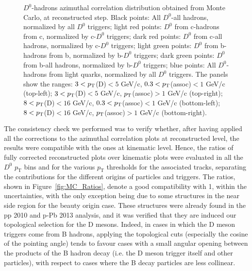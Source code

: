 \begin{figure}
\caption{$D^0$-hadrons azimuthal correlation distribution obtained from Monte Carlo, at reconstructed step. Black points: All $D^0$-all hadrons, normalized by all $D^0$ triggers; light red points: $D^0$ from c-hadrons from c, normalized by c-$D^0$ triggers; dark red points: $D^0$ from c-all hadrons, normalized by c-$D^0$ triggers; light green points: $D^0$ from b-hadrons from b, normalized by b-$D^0$ triggers; dark green points: $D^0$ from b-all hadrons, normalized by b-$D^0$ triggers; blue points: All $D^0$-hadrons from light quarks, normalized by all $D^0$ triggers.
The panels show the ranges: $3 < p_{\rm T}$(D)$ < 5$ GeV/c, $0.3 < p_{\rm T}$(assoc)$ < 1$ GeV/c (top-left); $3 < p_{\rm T}$(D)$ < 5$ GeV/c, $p_{\rm T}$(assoc)$ > 1$ GeV/c (top-right); $8 < p_{\rm T}$(D)$ < 16$ GeV/c, $0.3 < p_{\rm T}$(assoc)$ < 1$ GeV/c (bottom-left); $8 < p_{\rm T}$(D)$ < 16$ GeV/c, $p_{\rm T}$(assoc)$ > 1$ GeV/c (bottom-right).}
\label{fig:MC_Reco}
\end{figure}

The consistency check we performed was to verify whether, after having applied all the corrections to the azimuthal correlation plots at reconstructed level, the results were compatible with the ones at kinematic level. Hence, the ratios of fully corrected reconstructed plots over kinematic plots were evaluated in all the $D^0$ $p_\text{T}$ bins and for the various $p_\text{T}$ thresholds for the associated tracks, separating the contributions for the different origins of particles and triggers. The ratios, shown in Figure~\ref{fig:MC_Ratios}, denote a good compatibility with 1, within the uncertainties, with the only exception being due to some structures in the near side region for the beauty origin case.
These structures were already found in the pp 2010 and p-Pb 2013 analysis, and it was verified that they are induced our topological selection for the D mesons. Indeed, in cases in which the D meson triggers come from B hadrons, applying the topological cuts (especially the cosine of the pointing angle) tends to favour cases with a small angular opening between the products of the B hadron decay (i.e. the D meson trigger itself and other particles), with respect to cases where the B decay particles are less collinear.

